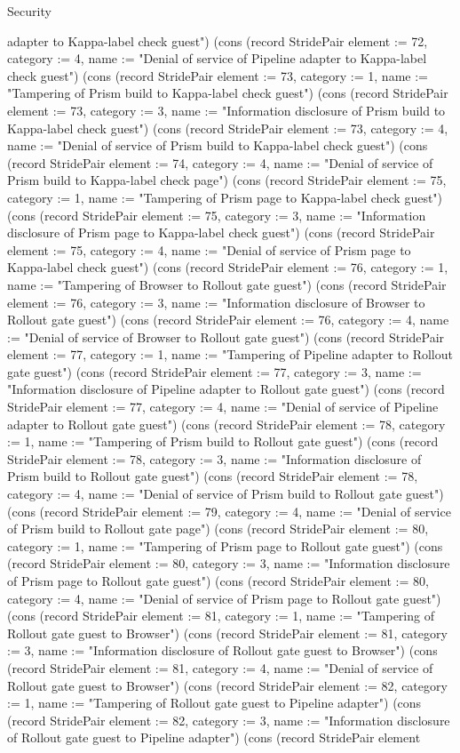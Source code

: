 \begin{lexlean}{Security}
\begin{semanticmodule}
{adapter to Kappa-label check guest"}) (cons (record StridePair {element := 72, category := 4, name := "Denial of service of Pipeline adapter to Kappa-label check guest"}) (cons (record StridePair {element := 73, category := 1, name := "Tampering of Prism build to Kappa-label check guest"}) (cons (record StridePair {element := 73, category := 3, name := "Information disclosure of Prism build to Kappa-label check guest"}) (cons (record StridePair {element := 73, category := 4, name := "Denial of service of Prism build to Kappa-label check guest"}) (cons (record StridePair {element := 74, category := 4, name := "Denial of service of Prism build to Kappa-label check page"}) (cons (record StridePair {element := 75, category := 1, name := "Tampering of Prism page to Kappa-label check guest"}) (cons (record StridePair {element := 75, category := 3, name := "Information disclosure of Prism page to Kappa-label check guest"}) (cons (record StridePair {element := 75, category := 4, name := "Denial of service of Prism page to Kappa-label check guest"}) (cons (record StridePair {element := 76, category := 1, name := "Tampering of Browser to Rollout gate guest"}) (cons (record StridePair {element := 76, category := 3, name := "Information disclosure of Browser to Rollout gate guest"}) (cons (record StridePair {element := 76, category := 4, name := "Denial of service of Browser to Rollout gate guest"}) (cons (record StridePair {element := 77, category := 1, name := "Tampering of Pipeline adapter to Rollout gate guest"}) (cons (record StridePair {element := 77, category := 3, name := "Information disclosure of Pipeline adapter to Rollout gate guest"}) (cons (record StridePair {element := 77, category := 4, name := "Denial of service of Pipeline adapter to Rollout gate guest"}) (cons (record StridePair {element := 78, category := 1, name := "Tampering of Prism build to Rollout gate guest"}) (cons (record StridePair {element := 78, category := 3, name := "Information disclosure of Prism build to Rollout gate guest"}) (cons (record StridePair {element := 78, category := 4, name := "Denial of service of Prism build to Rollout gate guest"}) (cons (record StridePair {element := 79, category := 4, name := "Denial of service of Prism build to Rollout gate page"}) (cons (record StridePair {element := 80, category := 1, name := "Tampering of Prism page to Rollout gate guest"}) (cons (record StridePair {element := 80, category := 3, name := "Information disclosure of Prism page to Rollout gate guest"}) (cons (record StridePair {element := 80, category := 4, name := "Denial of service of Prism page to Rollout gate guest"}) (cons (record StridePair {element := 81, category := 1, name := "Tampering of Rollout gate guest to Browser"}) (cons (record StridePair {element := 81, category := 3, name := "Information disclosure of Rollout gate guest to Browser"}) (cons (record StridePair {element := 81, category := 4, name := "Denial of service of Rollout gate guest to Browser"}) (cons (record StridePair {element := 82, category := 1, name := "Tampering of Rollout gate guest to Pipeline adapter"}) (cons (record StridePair {element := 82, category := 3, name := "Information disclosure of Rollout gate guest to Pipeline adapter"}) (cons (record StridePair {element }
\end{semanticmodule}
\end{lexlean}
